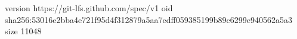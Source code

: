 version https://git-lfs.github.com/spec/v1
oid sha256:53016e2bba4e721f95d4f312879a5aa7edff059385199b89c6299e940562a5a3
size 11048
